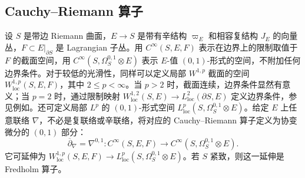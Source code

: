 \subsection{Cauchy–Riemann 算子}\label{sec:8h}
设 $S$ 是带边 Riemann 曲面，$E\to S$ 是带有辛结构 $\varpi_E$ 和相容复结构 $J_E$ 的向量丛，$F\subset E|_{\partial S}$ 是 Lagrangian 子丛。用 $C^\infty(S,E,F)$ 表示在边界上的限制取值于 $F$ 的截面空间，用 $C^\infty(S,\Omega_S^{0,1}\otimes E)$ 表示 $E$-值 $(0,1)$-形式的空间，不附加任何边界条件。对于较低的光滑性，同样可以定义局部 $W^{1,p}$ 截面的空间 $W_{\mathrm{loc}}^{1,p}(S,E,F)$，其中 $2\leq p<\infty$。当 $p>2$ 时，截面连续，边界条件显然有意义；当 $p=2$ 时，通过限制映射 $W_{\mathrm{loc}}^{1,2}(S,E)\to L_{\mathrm{loc}}^2(\partial S,E)$ 定义边界条件，参见例如。还可定义局部 $L^p$ 的 $(0,1)$-形式空间 $L_{\mathrm{loc}}^p(S,\Omega_S^{0,1}\otimes E)$。给定 $E$ 上任意联络 $\nabla$，不必是复联络或辛联络，将对应的 Cauchy–Riemann 算子定义为协变微分的 $(0,1)$ 部分：
\begin{equation}\label{eq:8.13}
\overline\partial_\nabla=\nabla^{0,1}:C^\infty(S,E,F)\longrightarrow C^\infty(S,\Omega_S^{0,1}\otimes E).
\end{equation}
它可延伸为 $W_{\mathrm{loc}}^{1,p}(S,E,F)\to L_{\mathrm{loc}}^p(S,\Omega_S^{0,1}\otimes E)$。若 $S$ 紧致，则这一延伸是 Fredholm 算子。

